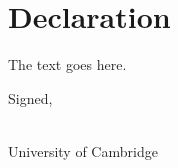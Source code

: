 \chapter*{Declaration}

\noindent
The text goes here.


\vspace{2cm}
Signed,\\

\makeatletter
\vspace{2cm}
\@author\\
\@date
\makeatother

University of Cambridge
